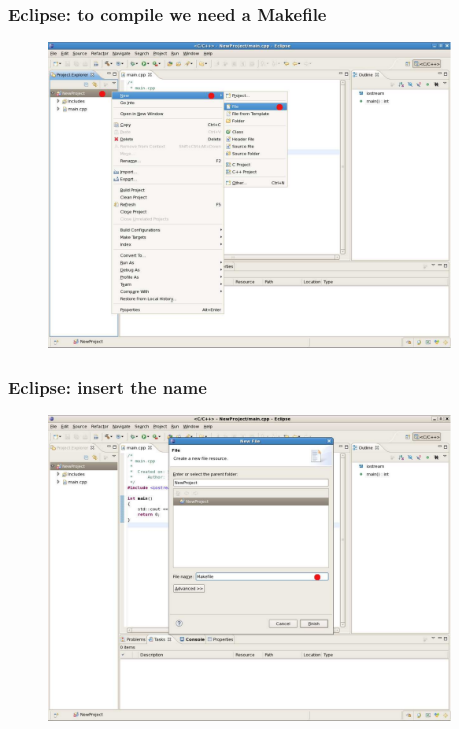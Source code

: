 \documentclass{beamer}
\begin{document}

\begin{frame}[fragile]

    \frametitle{Eclipse: to compile we need a Makefile}

    \begin{figure}
        \centering
        \includegraphics[width=0.95\textwidth]{./images/eclipse6}
    \end{figure}

\end{frame}


\begin{frame}[fragile]

    \frametitle{Eclipse: insert the name}

    \begin{figure}
        \centering
        \includegraphics[width=0.95\textwidth]{./images/eclipse7}
    \end{figure}

\end{frame}
\end{document}

